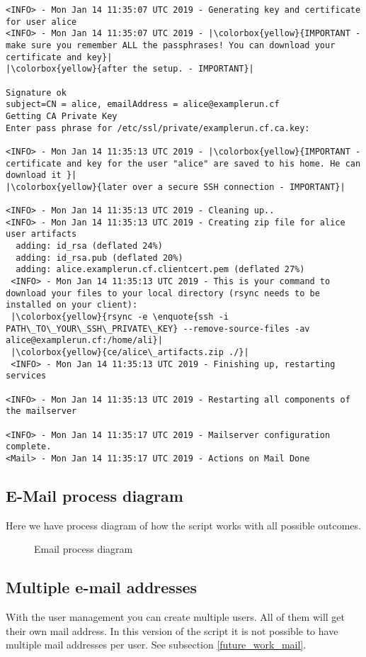 \begin{lstlisting}[escapeinside=||]
<INFO> - Mon Jan 14 11:35:07 UTC 2019 - Generating key and certificate for user alice
<INFO> - Mon Jan 14 11:35:07 UTC 2019 - |\colorbox{yellow}{IMPORTANT - make sure you remember ALL the passphrases! You can download your certificate and key}| 
|\colorbox{yellow}{after the setup. - IMPORTANT}|

Signature ok
subject=CN = alice, emailAddress = alice@examplerun.cf
Getting CA Private Key
Enter pass phrase for /etc/ssl/private/examplerun.cf.ca.key:

<INFO> - Mon Jan 14 11:35:13 UTC 2019 - |\colorbox{yellow}{IMPORTANT - certificate and key for the user "alice" are saved to his home. He can download it }|
|\colorbox{yellow}{later over a secure SSH connection - IMPORTANT}|

<INFO> - Mon Jan 14 11:35:13 UTC 2019 - Cleaning up..
<INFO> - Mon Jan 14 11:35:13 UTC 2019 - Creating zip file for alice user artifacts
  adding: id_rsa (deflated 24%)
  adding: id_rsa.pub (deflated 20%)
  adding: alice.examplerun.cf.clientcert.pem (deflated 27%)
 <INFO> - Mon Jan 14 11:35:13 UTC 2019 - This is your command to download your files to your local directory (rsync needs to be installed on your client): 
 |\colorbox{yellow}{rsync -e \enquote{ssh -i PATH\_TO\_YOUR\_SSH\_PRIVATE\_KEY} --remove-source-files -av alice@examplerun.cf:/home/ali}|
 |\colorbox{yellow}{ce/alice\_artifacts.zip ./}|
 <INFO> - Mon Jan 14 11:35:13 UTC 2019 - Finishing up, restarting services

<INFO> - Mon Jan 14 11:35:13 UTC 2019 - Restarting all components of the mailserver

<INFO> - Mon Jan 14 11:35:17 UTC 2019 - Mailserver configuration complete.
<Mail> - Mon Jan 14 11:35:17 UTC 2019 - Actions on Mail Done
 \end{lstlisting}
 \newpage
 
\subsection{E-Mail process diagram}
Here we have process diagram of how the script works with all possible outcomes.

\begin{figure}[H]
        \usetikzlibrary{shapes,arrows,calc}
        \centering
        
        \caption{Email process diagram}
\end{figure}

\subsection{Multiple e-mail addresses}
With the user management you can create multiple users. All of them will get their own mail address. In this version of the script it is not possible to have multiple mail addresses per user. See subsection \ref{future_work_mail}.

\newpage

